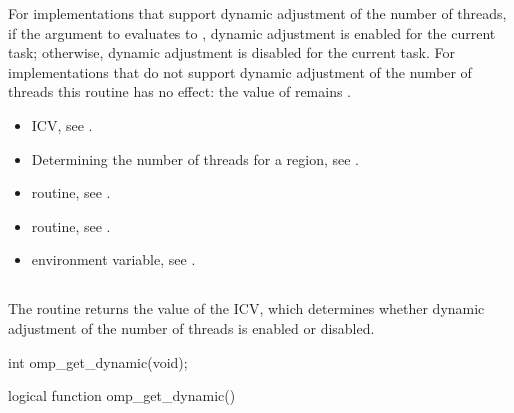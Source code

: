 \effect
For implementations that support dynamic adjustment of the number of threads, if the
argument to  evaluates to , dynamic adjustment is enabled for
the current task; otherwise, dynamic adjustment is disabled for the current task. For
implementations that do not support dynamic adjustment of the number of threads this
routine has no effect: the value of  remains .

\crossreferences
\begin{itemize}
\item {} ICV, see
.

\item Determining the number of threads for a  region, see
.

\item {} routine, see
.

\item {} routine, see
.

\item {} environment variable, see
.
\end{itemize}








\subsection{}
\label{subsec:omp_get_dynamic}
\summary
The  routine returns the value of the  ICV, which
determines whether dynamic adjustment of the number of threads is enabled or disabled.

\format
\begin{ccppspecific}
\begin{ompcFunction}
int omp_get_dynamic(void);
\end{ompcFunction}
\end{ccppspecific}

\begin{fortranspecific}
\begin{ompfFunction}
logical function omp_get_dynamic()
\end{ompfFunction}
\end{fortranspecific}

